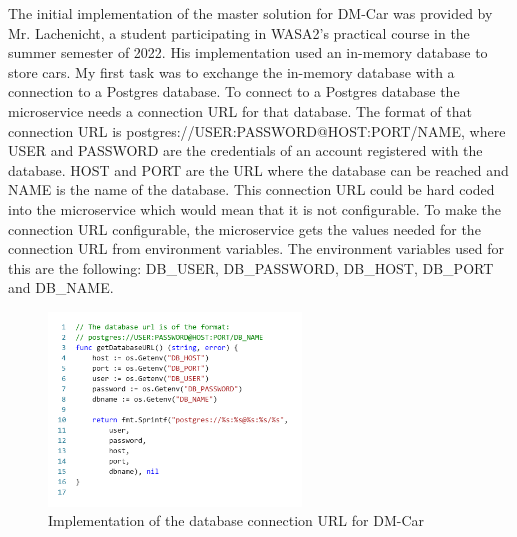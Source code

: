 

The initial implementation of the master solution for DM-Car was provided
by Mr. Lachenicht, a student participating in WASA2's practical course in
the summer semester of 2022. His implementation used an in-memory database
to store cars. My first task was to exchange the in-memory database
with a connection to a Postgres database.
To connect to a Postgres database the microservice needs a connection URL
for that database. The format of that connection URL is 
postgres://USER:PASSWORD@HOST:PORT/NAME, where USER and PASSWORD are the credentials
of an account registered with the database. HOST and PORT are the URL where the
database can be reached and NAME is the name of the database.
This connection URL could be hard coded into the microservice which would mean that it
is not configurable. To make the connection URL configurable, the microservice
gets the values needed for the connection URL from environment variables.
The environment variables used for this are the following:
DB\_USER, DB\_PASSWORD, DB\_HOST, DB\_PORT and DB\_NAME.

\begin{figure}[h]
	\centering
	\includegraphics[width=0.6\textwidth]{figures/Code Snippets/DM-Car_database_connection_url.png}
	\caption{Implementation of the database connection URL for DM-Car}
	\label{fig:dm_car_database_connection_url}
\end{figure}


